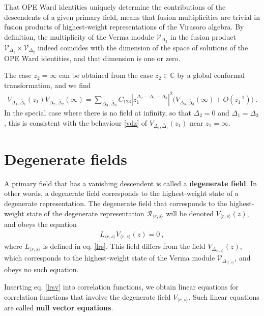 \documentclass[12pt, a4paper, notitlepage, twoside]{report}
\numberwithin{equation}{section}
\theoremstyle{break}
\begin{document}
That OPE Ward identities uniquely determine the contributions of the descendents of a given primary field, means that fusion multiplicities are trivial in fusion products of highest-weight representations of the Virasoro algebra. By definition, the multiplicity of the Verma module $\mathcal{V}_{\Delta_3}$ in the fusion product $\mathcal{V}_{\Delta_1}\times \mathcal{V}_{\Delta_2}$ indeed coincides with the dimension of the space of solutions of the OPE Ward identities, and that dimension is one or zero.

The case $z_2=\infty$ can be obtained from the case $z_2\in\mathbb{C}$ by a global conformal transformation, and we find 
\begin{align}
 V_{\Delta_1,\bar\Delta_1}(z_1) V_{\Delta_2,\bar\Delta_2}(\infty) =  \sum_{\Delta_3,\bar\Delta_3}C_{123}\left| z_1^{\Delta_2-\Delta_1-\Delta_3}\right|^2 \Big( V_{\Delta_3,\bar\Delta_3}(\infty) + O\left(z_1^{-1}\right)\Big) \ .
 \label{iope}
\end{align}
In the special case where there is no field at infinity, so that $\Delta_2=0$ and $\Delta_1=\Delta_3$, this is consistent with the behaviour \eqref{vdz} of $V_{\Delta_1,\bar\Delta_1}(z_1)$ near $z_1=\infty$.


\section{Degenerate fields}\label{sec:degf}

A primary field that has a vanishing descendent is called a \textbf{\boldmath degenerate field}.
In other words, a degenerate field corresponds to the highest-weight state of a degenerate representation.
The degenerate field that corresponds to the highest-weight state of the degenerate representation $\mathcal{R}_{\langle r,s \rangle}$ will be denoted $V_{\langle r,s\rangle}(z)$, and obeys the equation 
\begin{align}
 L_{\langle r,s \rangle} V_{\langle r,s \rangle}(z) = 0 \ , 
\label{lrsv}
\end{align}
where $L_{\langle r,s \rangle}$ is defined in eq. \eqref{lrs}.
This field differs from the field $V_{\Delta_{\langle r,s \rangle}}(z)$, which corresponds to the highest-weight state of the Verma module $\mathcal{V}_{\Delta_{\langle r,s \rangle}}$, and obeys no such equation.

Inserting eq. \eqref{lrsv} into correlation functions, we obtain linear equations for correlation functions that involve the degenerate field $V_{\langle r,s\rangle}$. Such linear equations are called \textbf{\boldmath null vector equations}. 
\end{document}
